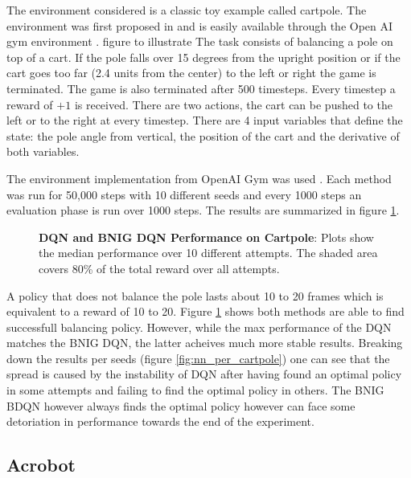 The environment considered is a classic toy example called cartpole. The environment was first proposed in \cite{barto_sutton_1983} and is easily available through the Open AI gym environment \citep{brockman_2016}.
\todo figure to illustrate 
The task consists of balancing a pole on top of a cart. If the pole falls over 15 degrees from the upright position or if the cart goes too far (2.4 units from the center) to the left or right the game is terminated. The game is also terminated after 500 timesteps. Every timestep a reward of $+1$ is received. There are two actions, the cart can be pushed to the left or to the right at every timestep. There are 4 input variables that define the state: the pole angle from vertical, the position of the cart and the derivative of both variables. 

The environment implementation from OpenAI Gym was used \citep{OpenAI_gym}. Each method was run for 50,000 steps with 10 different seeds and every 1000 steps an evaluation phase is run over 1000 steps. The results are summarized in figure \ref{fig:nn_cartpole}.

\begin{figure}[H]
    \centering
    \caption{\textbf{DQN and BNIG DQN Performance on Cartpole}: Plots show the median performance over 10 different attempts. The shaded area covers 80\% of the total reward over all attempts.}
    \label{fig:nn_cartpole}
\end{figure}

A policy that does not balance the pole lasts about 10 to 20 frames which is equivalent to a reward of 10 to 20. Figure \ref{fig:nn_cartpole} shows both methods are able to find successfull balancing policy. However, while the max performance of the DQN matches the BNIG DQN, the latter acheives much more stable results. Breaking down the results per seeds (figure \ref{fig:nn_per_cartpole}) one can see that the spread is caused by the instability of DQN after having found an optimal policy in some attempts and failing to find the optimal policy in others. The BNIG BDQN however always finds the optimal policy however can face some detoriation in performance towards the end of the experiment. 

\subsection{Acrobot}

